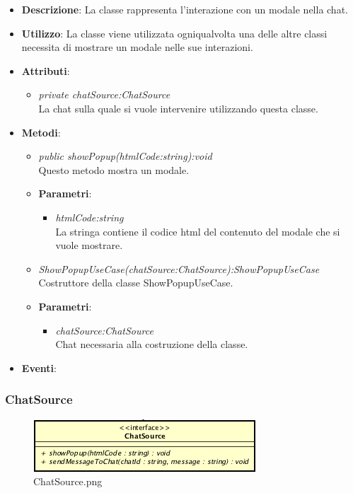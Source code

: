 \begin{itemize}
\item \textbf{Descrizione}: La classe rappresenta l'interazione con un modale nella chat.
\item \textbf{Utilizzo}: La classe viene utilizzata ogniqualvolta una delle altre classi necessita di mostrare un modale nelle sue interazioni.
\item \textbf{Attributi}: 
	\begin{itemize}
	\item \textit{private chatSource:ChatSource}\\
	La chat sulla quale si vuole intervenire utilizzando questa classe.
	\end{itemize}
\item \textbf{Metodi}:
	\begin{itemize}
	\item \textit{public showPopup(htmlCode:string):void}\\
	Questo metodo mostra un modale.
			\item{\textbf{Parametri}: \begin{itemize}
			\item \textit{htmlCode:string}\\
			La stringa contiene il codice html del contenuto del modale che si vuole mostrare.
			\end{itemize}}
	\item \textit{ShowPopupUseCase(chatSource:ChatSource):ShowPopupUseCase}\\
	Costruttore della classe ShowPopupUseCase.
		\item{\textbf{Parametri}: \begin{itemize}
		\item \textit{chatSource:ChatSource}\\
		Chat necessaria alla costruzione della classe.
		\end{itemize}}
	\end{itemize}
\item \textbf{Eventi}:
\end{itemize}

\subsubsection{ChatSource}

\label{ChatSource}
\begin{figure}[ht]
	\centering
	\includegraphics[scale=0.5]{Sezioni/SottosezioniST/img/app/ChatSource.png}
	\caption{ChatSource.png}
\end{figure}

